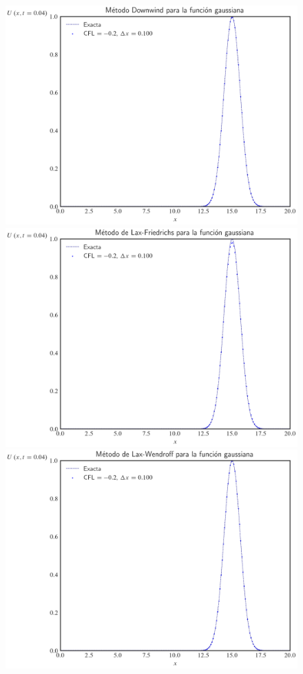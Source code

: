 \begin{frame}
    \frametitle{\secname}
    \begin{figure}[ht!]
        \centering
        \includegraphics[width=.30\paperwidth]{../snapshots/downwindgaussian1d-2.png}
        \includegraphics[width=.30\paperwidth]{../snapshots/lax-friedrichsgaussiana1d-2.png}
        \includegraphics[width=.30\paperwidth]{../snapshots/lax-wendroffgaussiana1d-2.png}

\end{figure}
\end{frame}
